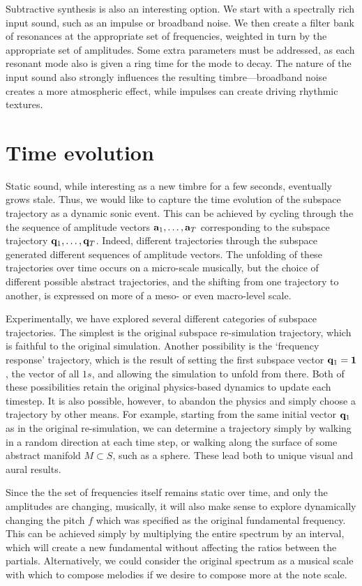 \documentclass[11pt]{article}
\begin{document}
Subtractive synthesis is also an interesting option. We start with a spectrally rich input sound, such as an impulse or broadband noise. We then create a filter bank of resonances at the appropriate set of frequencies, weighted in turn by the appropriate set of amplitudes. Some extra parameters must be addressed, as each resonant mode also is given a ring time for the mode to decay. The nature of the input sound also strongly influences the resulting timbre---broadband noise creates a more atmospheric effect, while impulses can create driving rhythmic textures. 

\section*{Time evolution}
Static sound, while interesting as a new timbre for a few seconds, eventually grows stale. Thus, we would like to capture the time evolution of the subspace trajectory as a dynamic sonic event. This can be achieved by cycling through the the sequence of amplitude vectors $\mathbf{a}_1, \ldots, \mathbf{a}_T$ corresponding to the subspace trajectory $\mathbf{q}_1, \ldots, \mathbf{q}_T$. Indeed, different trajectories through the subspace generated different sequences of amplitude vectors. The unfolding of these trajectories over time occurs on a micro-scale musically, but the choice of different possible abstract trajectories, and the shifting from one trajectory to another, is expressed on more of a meso- or even macro-level scale.

Experimentally, we have explored several different categories of subspace trajectories. The simplest is the original subspace re-simulation trajectory, which is faithful to the original simulation. Another possibility is the `frequency response' trajectory, which is the result of setting the first subspace vector $\mathbf{q}_1 = \mathbf{1}$, the vector of all $1s$, and allowing the simulation to unfold from there. Both of these possibilities retain the original physics-based dynamics to update each timestep. It is also possible, however, to abandon the physics and simply choose a trajectory by other means. For example, starting from the same initial vector $\mathbf{q}_1$ as in the original re-simulation, we can determine a trajectory simply by walking in a random direction at each time step, or walking along the surface of some abstract manifold $M \subset S$, such as a sphere. These lead both to unique visual and aural results. 

Since the the set of frequencies itself remains static over time, and only the amplitudes are changing, musically, it will also make sense to explore dynamically changing the pitch $f$ which was specified as the original fundamental frequency. This can be achieved simply by multiplying the entire spectrum by an interval, which will create a new fundamental without affecting the ratios between the partials. Alternatively, we could consider the original spectrum as a musical scale with which to compose melodies if we desire to compose more at the note scale.







\fontsize{10}{12}

\end{document}
